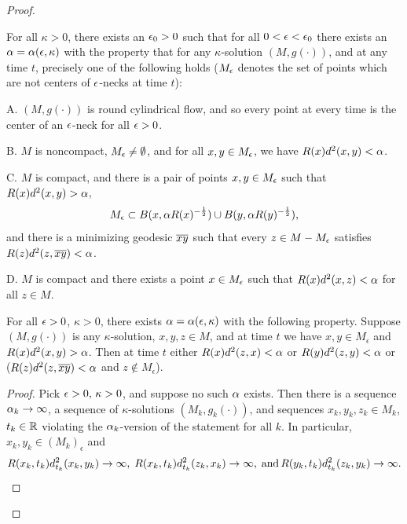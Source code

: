 \begin{proof}
\begin{corollary}
  \label{cor:kl-necklike-behavior-at-infinity-three-dimensional-solution-strong-version-existence-kappa-solutions}

\label{neckstructure}
For all $\kappa>0$, there exists an $\epsilon_0>0$ such that
for all $0<\epsilon<\epsilon_0$ there exists an $\alpha=\alpha(\epsilon,\kappa)$
with the property that for  any $\kappa$-solution $(M,g(\cdot))$,
and at any time $t$, precisely one of the following holds
($M_\epsilon$ denotes the set of points which are not centers of $\epsilon$-necks
at time $t$):

A.  $(M,g(\cdot))$ is round cylindrical flow, and
so every point at every time is the center of an $\epsilon$-neck for all
$\epsilon>0$.

B.  $M$ is noncompact, $M_\epsilon\neq\emptyset$, and for
all $x,y\in M_\epsilon$, we have $R(x)d^2(x,y)<\alpha$.

C.  $M$ is compact, and there is a pair of points
$x,y\in M_\epsilon$ such that $R(x)d^2(x,y)>\alpha$,
\begin{equation}
M_\epsilon\subset B(x,\alpha R(x)^{-\frac{1}{2}})\cup
B(y,\alpha R(y)^{-\frac{1}{2}}),
\end{equation}
and there is a minimizing geodesic $\overline{xy}$ such that
every $z\in M - M_\epsilon$ satisfies $R(z)d^2(z,\overline{xy})<\alpha$.

D. $M$ is compact and there exists a point $x\in M_\epsilon$
such that $R(x)d^2(x,z)<\alpha$ for all $z\in M$.
\end{corollary}


\begin{lemma}
  \label{lem:kl-necklike-behavior-at-infinity-three-dimensional-solution-strong-version-existence-kappa-solutions}

\label{annoy}
For all $\epsilon>0$, $\kappa>0$,  there exists
$\alpha=\alpha(\epsilon,\kappa)$  with the following
property.  Suppose $(M,g(\cdot))$ is any
$\kappa$-solution, $x,y,z\in M$, and
at time $t$ we have $x, y \in M_\epsilon$
and $R(x)d^2(x,y)>\alpha$.  Then at time $t$ either
$R(x)d^2(z,x)<\alpha$ or $R(y)d^2(z,y)<\alpha$ or ($R(z)d^2(z,\overline{xy})<\alpha$ and
$z \notin M_\epsilon$).
\end{lemma}
\begin{proof}
Pick $\epsilon>0,\,\kappa>0$, and suppose no such $\alpha$ exists.  Then
there is a sequence $\alpha_k\rightarrow\infty$, a
sequence of $\kappa$-solutions $(M_k,g_k(\cdot))$,
and sequences $x_k,y_k,z_k\in M_k$, $t_k\in {\mathbb R}$ violating the $\alpha_k$-version
of the statement
for all $k$.  In particular, $x_k, y_k \in (M_k)_\epsilon$ and
\begin{equation}
R(x_k,t_k)d^2_{t_k}(x_k,y_k)\rightarrow\infty,\;
R(x_k,t_k)d^2_{t_k}(z_k,x_k)\rightarrow\infty,\;
\mbox{and}\,R(y_k,t_k)d^2_{t_k}(z_k,y_k)\rightarrow\infty.
\end{equation}


\end{proof}
\end{proof}
